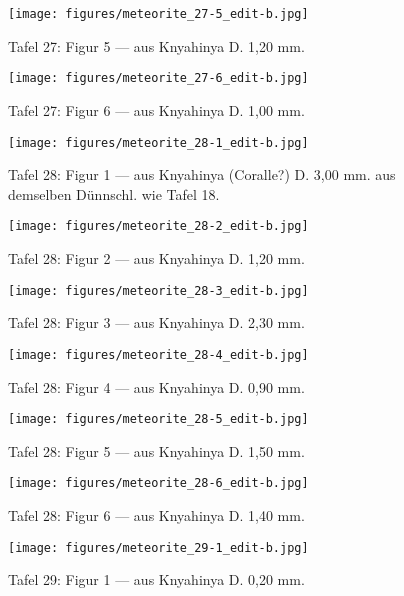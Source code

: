 \documentclass[a4paper, 12pt, oneside]{article}
\begin{document}
\clearpage
\begin{figure}[t]
\texttt{[image: figures/meteorite\_27-5\_edit-b.jpg]}
\caption{Tafel 27: Figur 5 --- aus Knyahinya D. 1,20 mm.}
\centering
\end{figure}
\clearpage
\begin{figure}[t]
\texttt{[image: figures/meteorite\_27-6\_edit-b.jpg]}
\caption{Tafel 27: Figur 6 --- aus Knyahinya D. 1,00 mm.}
\centering
\end{figure}
\clearpage
{}
\begin{figure}[t]
\texttt{[image: figures/meteorite\_28-1\_edit-b.jpg]}
\caption{Tafel 28: Figur 1 --- aus Knyahinya (Coralle?) D. 3,00 mm. aus demselben Dünnschl. wie Tafel 18.}
\centering
\end{figure}
\clearpage
\begin{figure}[t]
\texttt{[image: figures/meteorite\_28-2\_edit-b.jpg]}
\caption{Tafel 28: Figur 2 --- aus Knyahinya D. 1,20 mm.}
\centering
\end{figure}
\clearpage
\begin{figure}[t]
\texttt{[image: figures/meteorite\_28-3\_edit-b.jpg]}
\caption{Tafel 28: Figur 3 --- aus Knyahinya D. 2,30 mm.}
\centering
\end{figure}
\clearpage
\begin{figure}[t]
\texttt{[image: figures/meteorite\_28-4\_edit-b.jpg]}
\caption{Tafel 28: Figur 4 --- aus Knyahinya D. 0,90 mm.}
\centering
\end{figure}
\clearpage
\begin{figure}[t]
\texttt{[image: figures/meteorite\_28-5\_edit-b.jpg]}
\caption{Tafel 28: Figur 5 --- aus Knyahinya D. 1,50 mm.}
\centering
\end{figure}
\clearpage
\begin{figure}[t]
\texttt{[image: figures/meteorite\_28-6\_edit-b.jpg]}
\caption{Tafel 28: Figur 6 --- aus Knyahinya D. 1,40 mm.}
\centering
\end{figure}
\clearpage
{}
\begin{figure}[t]
\texttt{[image: figures/meteorite\_29-1\_edit-b.jpg]}
\caption{Tafel 29: Figur 1 --- aus Knyahinya D. 0,20 mm.}
\centering
\end{figure}
\end{document}
